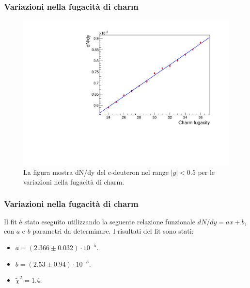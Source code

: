 \documentclass[11pt]{beamer}
\begin{document}
	
	\begin{frame}
		\frametitle{Variazioni nella fugacità di charm}
		\begin{figure}
			\centering
			\includegraphics[width=0.7 \linewidth]{pictures/var_fugacity.pdf}
			\caption{La figura mostra dN/dy del c-deuteron nel range $|y| < 0.5$ per le variazioni nella fugacità di charm.}
			\label{fig:var_fugacity}
		\end{figure}
	\end{frame}
	
	\begin{frame}
		\frametitle{Variazioni nella fugacità di charm}
		Il fit è stato eseguito utilizzando la seguente relazione funzionale $dN/dy = a x + b$, con $a$ e $b$ parametri da determinare. I risultati del fit sono stati:
		\begin{itemize}
			\item $a = (2.366 \pm 0.032) \cdot 10^{-5}$.
			\item $b = (2.53 \pm 0.94) \cdot 10^{-5}$.
			\item $\tilde{\chi}^2 = 1.4$.
		\end{itemize}
	\end{frame}
	
\end{document}
